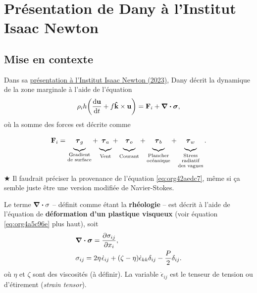 \documentclass[10pt]{article}
\numberwithin{equation}{section}
\newcommand{\kvf}{\vb{\hat{k}}}
\newcommand{\uu}{\vb{u}}
\newcommand{\short}{\vphantom{pA}}
\newcommand{\tall}{\vphantom{pA^{x^x}_p}}
\newcommand{\grande}{\vphantom{\frac{1}{xx}}}
\newcommand{\pt}{\hspace{1pt}} %
\begin{document}
\section{Présentation de Dany à l'Institut Isaac Newton}
\label{sec:orgbedf537}

\subsection{Mise en contexte}
\label{sec:orge52074d}

Dans sa \href{https://www.youtube.com/watch?v=\_V7ozTp6SJM}{présentation à l'Institut Isaac Newton (2023)}, Dany décrit la dynamique de la zone marginale à l'aide de l'équation
\begin{equation}
\label{eq:org42aedc7}
   \rho_i h \qty(\dv{\uu}{t} + f \kvf\times\uu) = \vb{F}_i + \divergence{\boldsymbol{\sigma}},
\end{equation}
où la somme des forces est décrite comme
\begin{equation}
\label{eq:org4350ea9}
   \vb{F}_i =
    \underbrace{\grande\boldsymbol{\tau}_g}_{\substack{\text{Gradient}\short\\\text{de surface}}}
   +\underbrace{\grande\boldsymbol{\tau}_a}_{\tall\text{Vent}}
   +\underbrace{\grande\boldsymbol{\tau}_o}_{\tall\text{Courant}}
   +\underbrace{\grande\boldsymbol{\tau}_b}_{\substack{\text{Plancher}\vphantom{A^2p}\\\text{océanique}}}
   +\underbrace{\grande\boldsymbol{\tau}_w}_{\substack{\text{Stress}\short\vphantom{A^1}\\\text{radiatif}\short\\\text{des vagues}}} .
\end{equation}
\(\bigstar\) Il faudrait préciser la provenance de l'équation \ref{eq:org42aedc7}, même si ça semble juste être une version modifiée de Navier-Stokes.\bigskip

Le terme \(\divergence{\sigma}\) -- définit comme étant la \textbf{rhéologie} -- est décrit à l'aide de l'équation de \textbf{déformation d'un plastique visqueux} \autocite{hunke1997elastic} (voir équation \ref{eq:org4a5c96e} plus haut), soit
\begin{align}
   & \divergence{\boldsymbol{\sigma}} = \pdv{\sigma_{ij}}{x_i},\\
   & \sigma_{ij} = 2\eta \pt\dot{\epsilon}_{ij} + \qty(\zeta - \eta) \dot{\epsilon}_{kk} \delta_{ij} - \frac{P}{2} \delta_{ij}.
\end{align}
où \(\eta\) et \(\zeta\) sont des viscosités (à définir).
La variable \(\dot{\epsilon}_{ij}\) est le tenseur de tension ou d'étirement (\emph{strain tensor}).\bigskip
\end{document}
